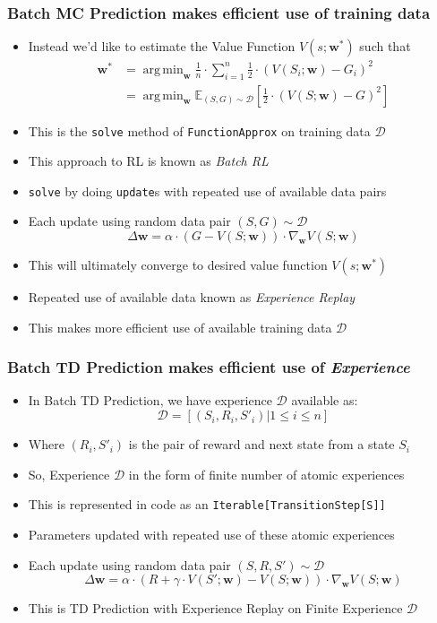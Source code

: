 \documentclass{beamer}
\DeclareMathOperator*{\argmin}{arg\,min}
\begin{document}
\begin{frame}
\frametitle{Batch MC Prediction makes efficient use of training data}
\pause
\begin{itemize}[<+->]
\item Instead we'd like to estimate the Value Function $V(s;\bm{w^*})$ such that
\begin{align*}
\bm{w^*} & = \argmin_{\bm{w}} \frac 1 n \cdot \sum_{i=1}^n \frac 1 2 \cdot (V(S_i;\bm{w}) - G_i)^2 \\
& = \argmin_{\bm{w}} \mathbb{E}_{(S,G) \sim \mathcal{D}} [\frac 1 2 \cdot (V(S; \bm{w}) - G)^2]
\end{align*}
\item This is the \lstinline{solve} method of \lstinline{FunctionApprox} on training data $\mathcal{D}$
\item This approach to RL is known as {\em Batch RL}
\item \lstinline{solve} by doing \lstinline{update}s with repeated use of available data pairs
\item Each update using random data pair $(S,G) \sim \mathcal{D}$
$$\Delta \bm{w} = \alpha \cdot (G - V(S; \bm{w})) \cdot \nabla_{\bm{w}} V(S; \bm{w})$$
\item This will ultimately converge to desired value function $V(s;\bm{w^*})$
\item Repeated use of available data  known as {\em Experience Replay} 
\item This makes more efficient use of available training data $\mathcal{D}$
\end{itemize}
\end{frame}

\begin{frame}
\frametitle{Batch TD Prediction makes efficient use of {\em Experience}}
\pause
\begin{itemize}[<+->]
\item In Batch TD Prediction, we have experience $\mathcal{D}$ available as:
$$\mathcal{D} = [(S_i, R_i, S'_i) | 1 \leq i \leq n]$$
\item Where $(R_i, S'_i)$ is the pair of reward and next state from a state $S_i$
\item So, Experience $\mathcal{D}$ in the form of finite number of atomic experiences
\item This is represented in code as an \lstinline{Iterable[TransitionStep[S]]}
\item Parameters updated with repeated use of these atomic experiences
\item Each update using random data pair $(S,R,S') \sim \mathcal{D}$
$$\Delta \bm{w} = \alpha \cdot (R + \gamma \cdot V(S'; \bm{w}) - V(S; \bm{w})) \cdot \nabla_{\bm{w}} V(S; \bm{w})$$
\item This is TD Prediction with Experience Replay on Finite Experience $\mathcal{D}$
\end{itemize}
\end{frame}
\end{document}
